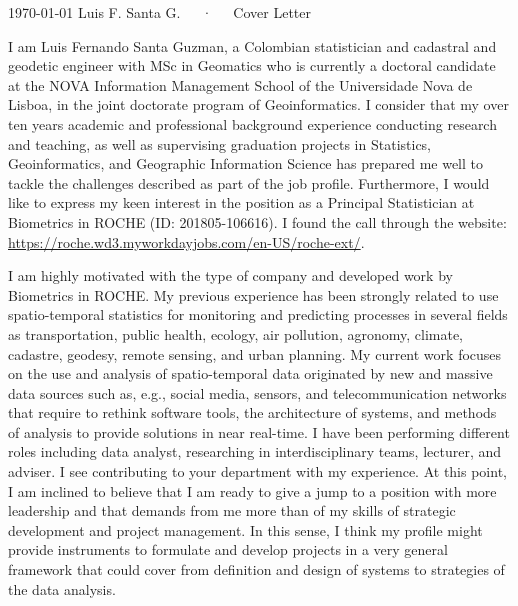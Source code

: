 \documentclass[11pt, a4paper]{awesome-cv}
\begin{document}
\makecvheader[R]

\makecvfooter
  {\today}
    {Luis F. Santa G.~~~·~~~Cover Letter}
  {}

\makelettertitle

\begin{cvletter}


I am Luis Fernando Santa Guzman, a Colombian statistician and cadastral and geodetic engineer with MSc in Geomatics who is currently a doctoral candidate at the NOVA Information Management School of the Universidade Nova de Lisboa, in the joint doctorate program of Geoinformatics. I consider that my over ten years academic and professional background experience conducting research and teaching, as well as supervising graduation projects in Statistics, Geoinformatics, and Geographic Information Science has prepared me well to tackle the challenges described as part of the job profile. Furthermore, I would like to express my keen interest in the position as a Principal Statistician at Biometrics in ROCHE (ID: 201805-106616). I found the call through the website: \url{https://roche.wd3.myworkdayjobs.com/en-US/roche-ext/}.\par 

I am highly motivated with the type of company and developed work by Biometrics in ROCHE. My previous experience has been strongly related to use spatio-temporal statistics for monitoring and predicting processes in several fields as transportation, public health, ecology, air pollution, agronomy, climate, cadastre, geodesy, remote sensing, and urban planning. My current work focuses on the use and analysis of spatio-temporal data originated by new and massive data sources such as, e.g., social media, sensors, and telecommunication networks that require to rethink software tools, the architecture of systems, and methods of analysis to provide solutions in near real-time. I have been performing different roles including data analyst, researching in interdisciplinary teams, lecturer, and adviser. I see contributing to your department with my experience. At this point, I am inclined to believe that I am ready to give a jump to a position with more leadership and that demands from me more than of my skills of strategic development and project management. In this sense, I think my profile might provide instruments to formulate and develop projects in a very general framework that could cover from definition and design of systems to strategies of the data analysis.\par


\end{cvletter}
\end{document}
